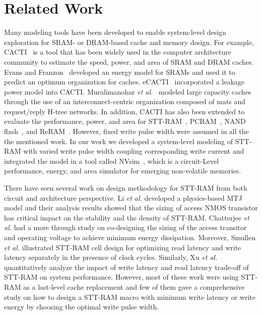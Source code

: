 \section{Related Work} \label{sec:relate}

Many modeling tools have been developed to enable system-level design exploration for SRAM- or DRAM-based cache and memory design.  For example, CACTI~\cite{CACTI51} is a tool that has been widely used in the computer architecture community to estimate the speed, power, and area of SRAM and DRAM caches.  Evans and Franzon~\cite{CACTI:JSSC95:Evans} developed an energy model for SRAMs and used it to predict an optimum organization for caches.  eCACTI~\cite{eCACTI} incorporated a leakage power model into CACTI.  Muralimanohar \emph{et al.}~\cite{CACTI60} modeled large capacity caches through the use of an interconnect-centric organization composed of mats and request/reply H-tree networks. In addition, CACTI has also been extended to evaluate the performance, power, and area for STT-RAM~\cite{CACTI:DAC08:Dong}, PCRAM~\cite{CACTI:PCRAMsim}, NAND flash~\cite{CACTI:DATE10:Mohan}, and ReRAM~\cite{CACTI:DATE11:Xu}. However, fixed write pulse width were assumed in all the the mentioned work. In our work we developed a system-level modeling of STT-RAM with varied write pulse width coupling corresponding write current and integrated the model in a tool called NVsim~\cite{CACTI:PCRAMsim}, which is a circuit-Level performance, energy, and area simulator for emerging non-volatile memories. 

There have seen several work on design methodology for STT-RAM from both circuit and architecture perspective. Li \emph{et al.} developed a physics-based MTJ model and their analysis results showed that the sizing of access NMOS transistor has critical impact on the stability and the density of STT-RAM. Chatterjee \emph{et al.} had a more  through study on co-designing the sizing of the access transitor and operating voltage to achieve minimum energy dissipation. Moreover, Smullen \emph{et al.} illustrated STT-RAM cell design for optimizing read latency and write latency separately in the presence of clock cycles. Similarly, Xu \emph{et al.} quantitatively analyze the impact of write latency and read latency trade-off of STT-RAM on system performance. However, most of these work were using STT-RAM as a last-level cache replacement and few of them gave a comprehensive study on how to design a STT-RAM macro with minimum write latency or write energy by choosing the optimal write pulse width.

